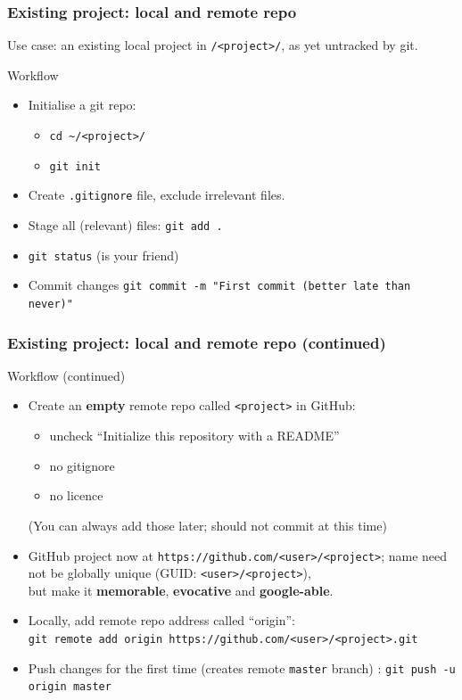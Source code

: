 \documentclass[10pt,svgnames]{beamer}
\begin{document}
\begin{frame}
\frametitle{Existing project: local and remote repo}
Use case: an existing local project in \lstinline{/<project>/}, as yet untracked by git.

\begin{block}{Workflow}
\begin{itemize}
  \item Initialise a git repo:
  \begin{itemize}
    \item \lstinline{cd ~/<project>/}
    \item \lstinline{git init}
  \end{itemize}
  \item Create \lstinline{.gitignore} file, exclude irrelevant files.
  \item Stage all (relevant) files: \lstinline{git add .}
  \item \lstinline{git status} (is your friend)
  \item Commit changes \lstinline{git commit -m "First commit (better late than never)"}
\end{itemize}
\end{block}
\end{frame}

\begin{frame}
\frametitle{Existing project: local and remote repo (continued)}

\begin{block}{Workflow (continued)}
\begin{itemize}
  \item Create an \textbf{empty} remote repo called \lstinline{<project>} in GitHub:
  \begin{itemize}
    \item uncheck “Initialize this repository with a README”
    \item no gitignore
    \item no licence
  \end{itemize}
  (You can always add those later; should not commit at this time)

  \item GitHub project now at \lstinline{https://github.com/<user>/<project>}; name need not be globally unique (GUID: \lstinline{<user>/<project>}),\\ but make it \textbf{memorable}, \textbf{evocative} and \textbf{google-able}.

  \item Locally, add remote repo address called “origin”: \\ \lstinline{git remote add origin https://github.com/<user>/<project>.git}

  \item Push changes for the first time (creates remote \lstinline{master} branch) :
  \lstinline{git push -u origin master}
\end{itemize}
\end{block}
\end{frame}
\end{document}
